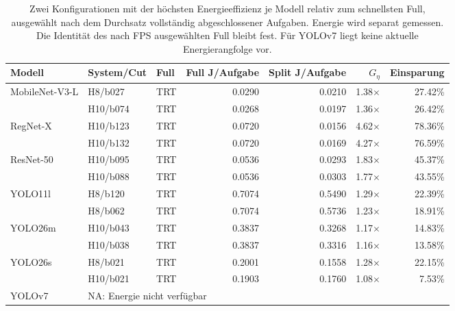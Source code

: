\begin{table}[t]
\centering
\caption{Zwei Konfigurationen mit der höchsten Energieeffizienz je Modell relativ zum schnellsten Full, ausgewählt nach dem Durchsatz vollständig abgeschlossener Aufgaben. Energie wird separat gemessen. Die Identität des nach FPS ausgewählten Full bleibt fest. Für YOLOv7 liegt keine aktuelle Energierangfolge vor.}
\label{tab:energy-leaders}
\small
\begin{tabular*}{\textwidth}{@{\extracolsep{\fill}}lllrrrr@{}}
\toprule
Modell & System/Cut & Full & Full J/Aufgabe & Split J/Aufgabe & $G_\eta$ & Einsparung\\
\midrule
MobileNet-V3-L & H8/b027 & TRT & 0.0290 & 0.0210 & 1.38$\times$ & 27.42\%\\
 & H10/b074 & TRT & 0.0268 & 0.0197 & 1.36$\times$ & 26.42\%\\
RegNet-X & H10/b123 & TRT & 0.0720 & 0.0156 & 4.62$\times$ & 78.36\%\\
 & H10/b132 & TRT & 0.0720 & 0.0169 & 4.27$\times$ & 76.59\%\\
ResNet-50 & H10/b095 & TRT & 0.0536 & 0.0293 & 1.83$\times$ & 45.37\%\\
 & H10/b088 & TRT & 0.0536 & 0.0303 & 1.77$\times$ & 43.55\%\\
YOLO11l & H8/b120 & TRT & 0.7074 & 0.5490 & 1.29$\times$ & 22.39\%\\
 & H8/b062 & TRT & 0.7074 & 0.5736 & 1.23$\times$ & 18.91\%\\
YOLO26m & H10/b043 & TRT & 0.3837 & 0.3268 & 1.17$\times$ & 14.83\%\\
 & H10/b038 & TRT & 0.3837 & 0.3316 & 1.16$\times$ & 13.58\%\\
YOLO26s & H8/b021 & TRT & 0.2001 & 0.1558 & 1.28$\times$ & 22.15\%\\
 & H10/b021 & TRT & 0.1903 & 0.1760 & 1.08$\times$ & 7.53\%\\
YOLOv7 & \multicolumn{6}{l}{NA: Energie nicht verfügbar}\\
\bottomrule
\end{tabular*}
\end{table}
